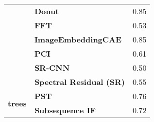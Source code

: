 \begin{table}
\begin{tabular}{llr}
\textbf{} & \textbf{Donut} & 0.85 \\
\textbf{} & \textbf{FFT} & 0.53 \\
\textbf{} & \textbf{ImageEmbeddingCAE} & 0.85 \\
\textbf{} & \textbf{PCI} & 0.61 \\
\textbf{} & \textbf{SR-CNN} & 0.50 \\
\textbf{} & \textbf{Spectral Residual (SR)} & 0.55 \\
\cline{1-3}
\multirow[t]{2}{*}{\textbf{trees}} & \textbf{PST} & 0.76 \\
\textbf{} & \textbf{Subsequence IF} & 0.72 \\
\cline{1-3}
\bottomrule
\end{tabular}
\end{table}

